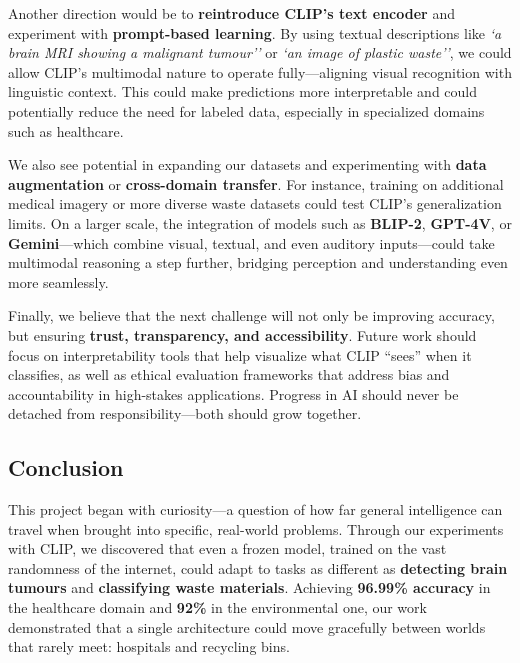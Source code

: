 \documentclass[12pt]{article}
\begin{document}
Another direction would be to \textbf{reintroduce CLIP’s text encoder} and experiment with \textbf{prompt-based learning}. By using textual descriptions like \textit{`a brain MRI showing a malignant tumour''} or \textit{`an image of plastic waste''}, we could allow CLIP’s multimodal nature to operate fully---aligning visual recognition with linguistic context. This could make predictions more interpretable and could potentially reduce the need for labeled data, especially in specialized domains such as healthcare.

We also see potential in expanding our datasets and experimenting with \textbf{data augmentation} or \textbf{cross-domain transfer}. For instance, training on additional medical imagery or more diverse waste datasets could test CLIP’s generalization limits. On a larger scale, the integration of models such as \textbf{BLIP-2}, \textbf{GPT-4V}, or \textbf{Gemini}---which combine visual, textual, and even auditory inputs---could take multimodal reasoning a step further, bridging perception and understanding even more seamlessly.

Finally, we believe that the next challenge will not only be improving accuracy, but ensuring \textbf{trust, transparency, and accessibility}. Future work should focus on interpretability tools that help visualize what CLIP ``sees'' when it classifies, as well as ethical evaluation frameworks that address bias and accountability in high-stakes applications. Progress in AI should never be detached from responsibility---both should grow together.

\subsection{Conclusion}
This project began with curiosity---a question of how far general intelligence can travel when brought into specific, real-world problems. Through our experiments with CLIP, we discovered that even a frozen model, trained on the vast randomness of the internet, could adapt to tasks as different as \textbf{detecting brain tumours} and \textbf{classifying waste materials}. Achieving \textbf{96.99\% accuracy} in the healthcare domain and \textbf{92\%} in the environmental one, our work demonstrated that a single architecture could move gracefully between worlds that rarely meet: hospitals and recycling bins.
\end{document}
